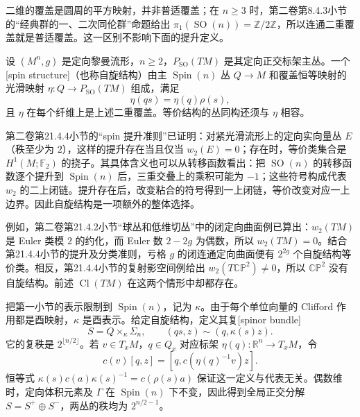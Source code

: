 二维的覆盖是圆周的平方映射，并非普适覆盖；在 \(n\ge3\) 时，第二卷第8.4.3小节的“经典群的一、二次同伦群”命题给出 \(\pi_1(\operatorname{SO}(n))=\mathbb Z/2\mathbb Z\)，所以连通二重覆盖就是普适覆盖。这一区别不影响下面的提升定义。

\begin{definition}\label{g3:def:riemannian-spin-structure}
	设 \((M^n,g)\) 是定向黎曼流形，\(n\ge2\)，\(P_{\operatorname{SO}}(TM)\) 是其定向正交标架主丛。一个[spin structure]（也称自旋结构）由主 \(\operatorname{Spin}(n)\) 丛 \(Q\to M\) 和覆盖恒等映射的光滑映射 \(\eta:Q\to P_{\operatorname{SO}}(TM)\) 组成，满足
	\[
		\eta(qs)=\eta(q)\rho(s),
	\]
	且 \(\eta\) 在每个纤维上是上述二重覆盖。等价结构的丛同构还须与 \(\eta\) 相容。
\end{definition}

第二卷第21.4.4小节的“spin 提升准则”已证明：对紧光滑流形上的定向实向量丛 \(E\)（秩至少为 \(2\)），这样的提升存在当且仅当 \(w_2(E)=0\)；存在时，等价类集合是 \(H^1(M;\mathbb F_2)\) 的挠子。其具体含义也可以从转移函数看出：把 \(\operatorname{SO}(n)\) 的转移函数逐个提升到 \(\operatorname{Spin}(n)\) 后，三重交叠上的乘积可能为 \(-1\)；这些符号构成代表 \(w_2\) 的二上闭链。提升存在后，改变粘合的符号得到一上闭链，等价改变对应一上边界。因此自旋结构是一项额外的整体选择。

\ProseParagraphBreak

例如，第二卷第21.4.2小节“球丛和低维切丛”中的闭定向曲面例已算出：\(w_2(TM)\) 是 Euler 类模 \(2\) 的约化，而 Euler 数 \(2-2g\) 为偶数，所以 \(w_2(TM)=0\)。结合第21.4.4小节的提升及分类准则，亏格 \(g\) 的闭连通定向曲面便有 \(2^{2g}\) 个自旋结构等价类。相反，第21.4.4小节的复射影空间例给出 \(w_2(T\mathbb{CP}^2)\ne0\)，所以 \(\mathbb{CP}^2\) 没有自旋结构。前述 \(\operatorname{Cl}(TM)\) 在这两个情形中却都存在。

\ProseParagraphBreak

把第一小节的表示限制到 \(\operatorname{Spin}(n)\)，记为 \(\kappa\)。由于每个单位向量的 Clifford 作用都是酉映射，\(\kappa\) 是酉表示。给定自旋结构，定义其复[spinor bundle]
\[
	S=Q\times_\kappa\Sigma_n,
	\qquad (qs,z)\sim(q,\kappa(s)z).
\]
它的复秩是 \(2^{\lfloor n/2\rfloor}\)。若 \(v\in T_xM\)，\(q\in Q_x\) 对应标架 \(\eta(q):\mathbb R^n\to T_xM\)，令
\[
	c(v)[q,z]=[q,c(\eta(q)^{-1}v)z].
\]
恒等式 \(\kappa(s)c(a)\kappa(s)^{-1}=c(\rho(s)a)\) 保证这一定义与代表无关。偶数维时，定向体积元素及 \(\Gamma\) 在 \(\operatorname{Spin}(n)\) 下不变，因此得到全局正交分解
\(S=S^+\oplus S^-\)，两丛的秩均为 \(2^{n/2-1}\)。

